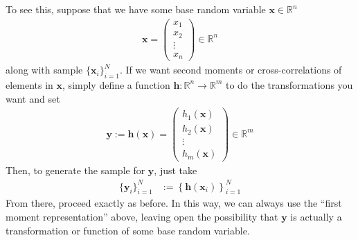 \documentclass[12pt]{article}
\theoremstyle{plain}
\theoremstyle{definition}
\theoremstyle{remark}
\newcommand{\bsh}{\boldsymbol{h}}
\newcommand{\bsx}{\boldsymbol{x}}
\newcommand{\bsy}{\boldsymbol{y}}
\begin{document}
To see this, suppose that we have some base random variable
$\bsx\in\mathbb{R}^n$
\begin{align*}
  \bsx =
  \begin{pmatrix}
    x_1\\x_2\\\vdots\\x_n
  \end{pmatrix}
  \in \mathbb{R}^n
\end{align*}
along with sample $\{\bsx_i\}_{i=1}^N$. If we want second
moments or cross-correlations of elements in $\bsx$, simply
define a function $\bsh: \mathbb{R}^n \rightarrow
\mathbb{R}^m$ to do the transformations you want and set
\begin{align*}
  \bsy
  :=\bsh(\bsx)
  =
  \begin{pmatrix}
    h_1(\bsx)\\h_2(\bsx)\\\vdots\\h_m(\bsx)
  \end{pmatrix}
  \in\mathbb{R}^m
\end{align*}
Then, to generate the sample for $\bsy$, just take
\begin{align*}
  \{\bsy_i\}_{i=1}^N &:=
  \left\{\bsh\left(\bsx_i\right)\right\}_{i=1}^N
\end{align*}
From there, proceed exactly as before. In this way, we can always use
the ``first moment representation'' above, leaving open the possibility
that $\bsy$ is actually a transformation or function of some
base random variable.
\end{document}
